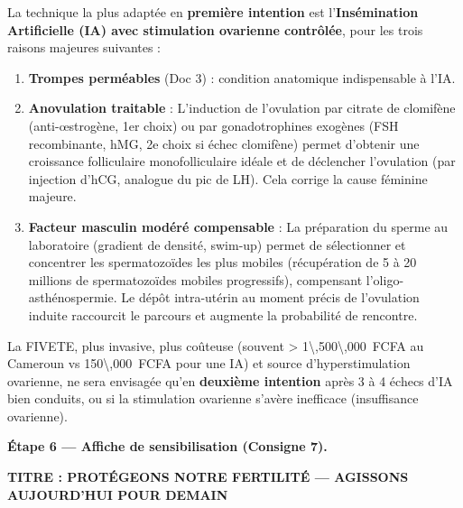 \documentclass[11pt]{article}
\begin{document}
\begin{exoresolu}
La technique la plus adaptée en \textbf{première intention} est l'\textbf{Insémination Artificielle (IA) avec stimulation ovarienne contrôlée}, pour les trois raisons majeures suivantes :
\begin{enumerate}
\item \textbf{Trompes perméables} (Doc 3) : condition anatomique indispensable à l'IA.
\item \textbf{Anovulation traitable} : L'induction de l'ovulation par citrate de clomifène (anti-œstrogène, 1er choix) ou par gonadotrophines exogènes (FSH recombinante, hMG, 2e choix si échec clomifène) permet d'obtenir une croissance folliculaire monofolliculaire idéale et de déclencher l'ovulation (par injection d'hCG, analogue du pic de LH). Cela corrige la cause féminine majeure.
\item \textbf{Facteur masculin modéré compensable} : La préparation du sperme au laboratoire (gradient de densité, swim-up) permet de sélectionner et concentrer les spermatozoïdes les plus mobiles (récupération de 5 à 20 millions de spermatozoïdes mobiles progressifs), compensant l'oligo-asthénospermie. Le dépôt intra-utérin au moment précis de l'ovulation induite raccourcit le parcours et augmente la probabilité de rencontre.
\end{enumerate}
La FIVETE, plus invasive, plus coûteuse (souvent > \SI{1\,500\,000}{FCFA} au Cameroun vs \SI{150\,000}{FCFA} pour une IA) et source d'hyperstimulation ovarienne, ne sera envisagée qu'en \textbf{deuxième intention} après 3 à 4 échecs d'IA bien conduits, ou si la stimulation ovarienne s'avère inefficace (insuffisance ovarienne).

\textbf{Étape 6 — Affiche de sensibilisation (Consigne 7).}

\begin{exemplebox}
\textbf{TITRE : PROTÉGEONS NOTRE FERTILITÉ — AGISSONS AUJOURD'HUI POUR DEMAIN}


\end{exemplebox}
\end{exoresolu}
\end{document}

